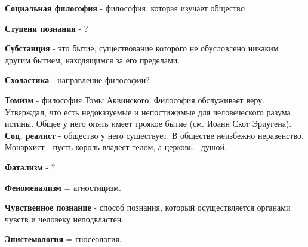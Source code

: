 \documentclass[12pt,a4paper]{article}
\begin{document}
\textbf{Социальная философия} - философия, которая изучает общество

\textbf{Ступени познания} - ?

\textbf{Субстанция} - это бытие, существование которого не обусловлено никаким другим бытием, находящимся за его пределами.

\textbf{Схоластика} - направление философии?

\textbf{Томизм} - философия Томы Аквинского. Философия обслуживает веру. Утверждал, что есть недоказуемые и непостижимые для человеческого разума истины. Общее у него опять имеет троякое бытие (см. Иоанн Скот Эриугена). \textbf{Соц. реалист} - общество у него существует. В обществе неизбежно неравенство. Монархист - пусть король владеет телом, а церковь - душой.

\textbf{Фатализм} - ?

\textbf{Феноменализм} = агностицизм.

\textbf{Чувственное познание} - способ познания, который осуществляется органами чувств и человеку неподвластен.

\textbf{Эпистемология} = гносеология.
\end{document}
